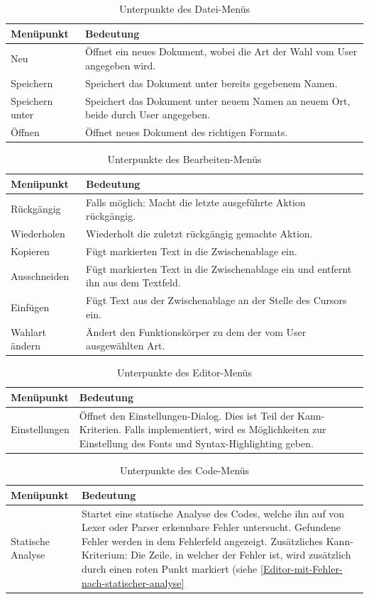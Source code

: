 \documentclass[a4paper]{scrreprt}
\begin{document}
\begin{table}[H]
\begin{tabular}{|p{3cm}|p{12cm}|}
Menüpunkt & Bedeutung \\
\hline
Neu & Öffnet ein neues Dokument, wobei die Art der Wahl vom User angegeben wird. \\
Speichern & Speichert das Dokument unter bereits gegebenem Namen. \\
Speichern unter & Speichert das Dokument unter neuem Namen an neuem Ort, beide durch User angegeben. \\
Öffnen & Öffnet neues Dokument des richtigen Formats.
\end{tabular}
\label{Datei-Menüpunkte}
\caption{Unterpunkte des Datei-Menüs}
\end{table}

\begin{table}[H]
\begin{tabular}{|p{3cm}|p{12cm}|}
Menüpunkt & Bedeutung \\
\hline
Rückgängig & Falls möglich: Macht die letzte ausgeführte Aktion rückgängig. \\
Wiederholen & Wiederholt die zuletzt rückgängig gemachte Aktion. \\
Kopieren & Fügt markierten Text in die Zwischenablage ein. \\
Ausschneiden & Fügt markierten Text in die Zwischenablage ein und entfernt ihn aus dem Textfeld. \\
Einfügen & Fügt Text aus der Zwischenablage an der Stelle des Cursors ein. \\
Wahlart ändern & Ändert den Funktionskörper zu dem der vom User ausgewählten Art.
\end{tabular}
\label{Bearbeiten-Menüpunkte}
\caption{Unterpunkte des Bearbeiten-Menüs}
\end{table}

\begin{table}[H]
\begin{tabular}{|p{3cm}|p{12cm}|}
Menüpunkt & Bedeutung \\
\hline
Einstellungen & Öffnet den Einstellungen-Dialog. Dies ist Teil der Kann-Kriterien. Falls implementiert, wird es Möglichkeiten zur Einstellung des Fonts und Syntax-Highlighting geben.
\end{tabular}
\label{Editor-Menüpunkte}
\caption{Unterpunkte des Editor-Menüs}
\end{table}

\begin{table}[H]
\begin{tabular}{|p{3cm}|p{12cm}|}
Menüpunkt & Bedeutung \\
\hline
Statische Analyse & Startet eine statische Analyse des Codes, welche ihn auf von Lexer oder Parser erkennbare Fehler untersucht. Gefundene Fehler werden in dem Fehlerfeld angezeigt. Zusätzliches Kann-Kriterium: Die Zeile, in welcher der Fehler ist, wird zusätzlich durch einen roten Punkt markiert (siehe \ref{Editor-mit-Fehler-nach-statischer-analyse}
\end{tabular}
\label{Editor-Menüpunkte}
\caption{Unterpunkte des Code-Menüs}
\end{table}
\end{document}
